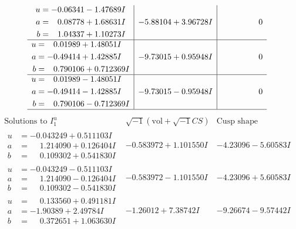 \documentclass[1p]{elsarticle_modified}
\theoremstyle{definition}
\newcommand{\I}{\sqrt{-1}}
\begin{document}
$$\begin{array}{c|c|c}
\begin{aligned}
u &= -0.06341 - 1.47689 I \\
a &= \phantom{-}0.08778 + 1.68631 I \\
b &= \phantom{-}1.04337 + 1.10273 I\end{aligned}
 & -5.88104 + 3.96728 I & \phantom{-0.000000 } 0 \\ \hline\begin{aligned}
u &= \phantom{-}0.01989 + 1.48051 I \\
a &= -0.49414 + 1.42885 I \\
b &= \phantom{-}0.790106 + 0.712369 I\end{aligned}
 & -9.73015 + 0.95948 I & \phantom{-0.000000 } 0 \\ \hline\begin{aligned}
u &= \phantom{-}0.01989 - 1.48051 I \\
a &= -0.49414 - 1.42885 I \\
b &= \phantom{-}0.790106 - 0.712369 I\end{aligned}
 & -9.73015 - 0.95948 I & \phantom{-0.000000 } 0\\
 \hline 
 \end{array}$$\newpage$$\begin{array}{c|c|c}  
\text{Solutions to }I^u_{1}& \I (\text{vol} + \sqrt{-1}CS) & \text{Cusp shape}\\
 \hline 
\begin{aligned}
u &= -0.043249 + 0.511103 I \\
a &= \phantom{-}1.214090 + 0.126404 I \\
b &= \phantom{-}0.109302 + 0.541830 I\end{aligned}
 & -0.583972 + 1.101550 I & -4.23096 - 5.60583 I \\ \hline\begin{aligned}
u &= -0.043249 - 0.511103 I \\
a &= \phantom{-}1.214090 - 0.126404 I \\
b &= \phantom{-}0.109302 - 0.541830 I\end{aligned}
 & -0.583972 - 1.101550 I & -4.23096 + 5.60583 I \\ \hline\begin{aligned}
u &= \phantom{-}0.133560 + 0.491181 I \\
a &= -1.90389 + 2.49784 I \\
b &= \phantom{-}0.372651 + 1.063630 I\end{aligned}
 & -1.26012 + 7.38742 I & -9.26674 - 9.57442 I \\ \hline\begin{aligned}

\end{aligned}
\end{array}$$
\end{document}
